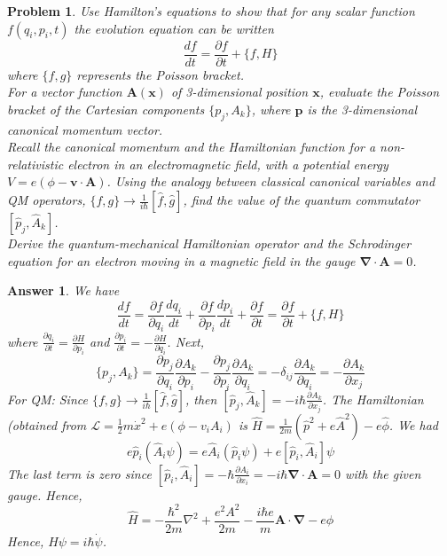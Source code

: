 \documentclass[a4paper]{article}
\newtheorem{ans}{Answer}[subsection]
\theoremstyle{new}
\newtheorem{qns}{Problem}[section]
\begin{document}
\begin{qns}
Use Hamilton’s equations to show that for any scalar function $f(q_i, p_i,t)$ the evolution equation can be written
$$\frac{df}{dt}=\frac{\partial f}{\partial t}+\{f,H\}$$
where $\{f,g\}$ represents the Poisson bracket.\\[5pt]
For a vector function $\mathbf{A}(\mathbf{x})$ of 3-dimensional position $\mathbf{x}$, evaluate the Poisson bracket of the Cartesian components $\{p_j,A_k\}$, where $\mathbf{p}$ is the 3-dimensional canonical momentum vector.\\[5pt]
Recall the canonical momentum and the Hamiltonian function for a non-relativistic electron in an electromagnetic field, with a potential energy $V=e(\phi-\mathbf{v}\cdot\mathbf{A})$. Using the analogy between classical canonical variables and QM operators, $\{f,g\}\rightarrow\frac{1}{i\hbar}[\hat{f},\hat{g}]$, find the value of the quantum commutator $[\hat{p}_j,\hat{A}_k]$.\\[5pt]
Derive the quantum-mechanical Hamiltonian operator and the Schrodinger equation for an electron moving in a magnetic field in the gauge $\boldsymbol{\nabla}\cdot\mathbf{A}=0$.
\end{qns}
\begin{ans}
We have
$$\frac{df}{dt}=\frac{\partial f}{\partial q_i}\frac{dq_i}{dt}+\frac{\partial f}{\partial p_i}\frac{dp_i}{dt}+\frac{\partial f}{\partial t}=\frac{\partial f}{\partial t}+\{f,H\}$$
where $\frac{\partial q_i}{\partial t}=\frac{\partial H}{\partial p_i}$ and $\frac{\partial p_i}{\partial t}=-\frac{\partial H}{\partial q_i}$. Next,
$$\{p_j,A_k\}=\frac{\partial p_j}{\partial q_i}\frac{\partial A_k}{\partial p_i}-\frac{\partial p_j}{\partial p_i}\frac{\partial A_k}{\partial q_i}=-\delta_{ij}\frac{\partial A_k}{\partial q_i}=-\frac{\partial A_k}{\partial x_j}$$
For QM: Since $\{f,g\}\rightarrow\frac{1}{i\hbar}[\hat{f},\hat{g}]$, then $[\hat{p}_j,\hat{A}_k]=-i\hbar\frac{\partial A_k}{\partial x_j}$. The Hamiltonian (obtained from $\mathcal{L}=\frac{1}{2}m\dot{x}^2+e(\phi-v_iA_i)$ is $\hat{H}=\frac{1}{2m}(\hat{p}^2+e\hat{A}^2)-e\hat{\phi}$. We had
$$e\hat{p}_i(\hat{A}_i\psi)=e\hat{A}_i(\hat{p}_i\psi)+e[\hat{p}_i,\hat{A}_i]\psi$$
The last term is zero since $[\hat{p}_i,\hat{A}_i]=-\hbar\frac{\partial A_i}{\partial x_i}=-i\hbar\boldsymbol{\nabla}\cdot\mathbf{A}=0$ with the given gauge. Hence,
$$\hat{H}=-\frac{\hbar^2}{2m}\nabla^2+\frac{e^2A^2}{2m}-\frac{i\hbar e}{m}\mathbf{A}\cdot\boldsymbol{\nabla}-e\phi$$
Hence, $\hat{H}\psi=i\hbar\dot{\psi}$.
\end{ans}
\end{document}
